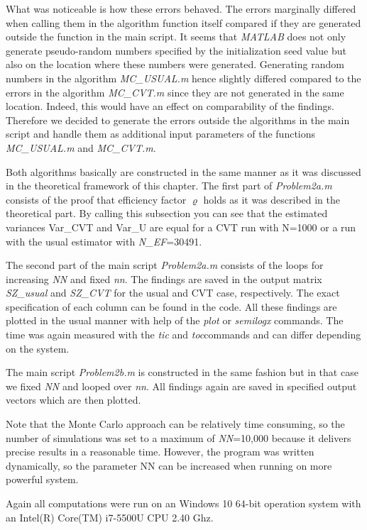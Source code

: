 \documentclass[a4paper,11pt]{article}
\begin{document}
{What was noticeable is how these errors behaved. The errors marginally differed when calling them in the algorithm function itself compared if they are generated outside the function in the main script. It seems that \textit{MATLAB} does not only generate pseudo-random numbers specified by the initialization seed value but also on the location where these numbers were generated. Generating random numbers in the algorithm \textit{MC\_USUAL.m} hence slightly differed compared to the errors in the algorithm \textit{MC\_CVT.m} since they are not generated in the same location. Indeed, this would have an effect on comparability of the findings. Therefore we decided to generate the errors outside the algorithms in the main script and handle them as additional input parameters of the functions \textit{MC\_USUAL.m} and \textit{MC\_CVT.m}.

Both algorithms basically are constructed in the same manner as it was discussed in the theoretical framework of this chapter. The first part of \textit{Problem2a.m} consists of the proof that efficiency factor $\varrho$ holds as it was described in the theoretical part. By calling this subsection you can see that the estimated variances Var\_CVT and Var\_U are equal for a CVT run with N=1000 or a run with the usual estimator with \textit{N\_EF}=30491. 

The second part of the main script \textit{Problem2a.m} consists of the loops for increasing \textit{NN} and fixed \textit{nn}. The findings are saved in the output matrix \textit{SZ\_usual} and \textit{SZ\_CVT} for the usual and CVT case, respectively. The exact specification of each column can be found in the code. All these findings are plotted in the usual manner with help of the \textit{plot} or \textit{semilogx} commands. The time was again measured with the \textit{tic} and \textit{toc}commands and can differ depending on the system.

The main script \textit{Problem2b.m} is constructed in the same fashion but in that case we fixed \textit{NN} and looped over \textit{nn}. All findings again are saved in specified output vectors which are then plotted.

Note that the Monte Carlo approach can be relatively time consuming, so the number of simulations was set to a maximum of \textit{NN}=10,000 because it delivers precise results in a reasonable time. However, the program was written dynamically, so the parameter NN can be increased when running on more powerful system.

Again all computations were run on an Windows 10 64-bit operation system with an Intel(R) Core(TM) i7-5500U CPU 2.40 Ghz.
\newpage

}
\end{document}
